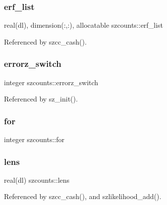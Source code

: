 \subsubsection{\texorpdfstring{erf\+\_\+list}{erf\_list}}
{\footnotesize\ttfamily real(dl), dimension(\+:,\+:), allocatable szcounts\+::erf\+\_\+list\hspace{0.3cm}{\ttfamily [private]}}



Referenced by szcc\+\_\+cash().

\mbox{\label{namespaceszcounts_a6def443ac3e0a9afd588d7251c768760}} 
\subsubsection{\texorpdfstring{errorz\+\_\+switch}{errorz\_switch}}
{\footnotesize\ttfamily integer szcounts\+::errorz\+\_\+switch\hspace{0.3cm}{\ttfamily [private]}}



Referenced by sz\+\_\+init().

\mbox{\label{namespaceszcounts_a27757054150c1df2c034d1404888b01d}} 
\subsubsection{\texorpdfstring{for}{for}}
{\footnotesize\ttfamily integer szcounts\+::for\hspace{0.3cm}{\ttfamily [private]}}

\mbox{\label{namespaceszcounts_a93fe6f6bac05415c56bdb59429db5345}} 
\subsubsection{\texorpdfstring{lens}{lens}}
{\footnotesize\ttfamily real(dl) szcounts\+::lens\hspace{0.3cm}{\ttfamily [private]}}



Referenced by szcc\+\_\+cash(), and szlikelihood\+\_\+add().

